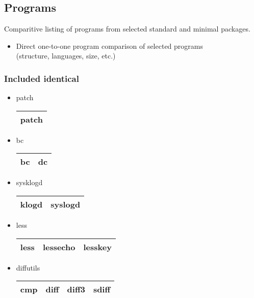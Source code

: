 \subsection{Programs}\label{Programs}

Comparitive listing of programs from selected standard and minimal packages.

\begin{itemize}
    \item Direct one-to-one program comparison of selected programs \\(structure, languages, size, etc.)
\end{itemize}

\newpage

\subsubsection{Included identical}

\begin{itemize}
    \item patch
        \begin{center}
            \begin{tabular}{|c|}
                \hline
                patch \\
                \hline
            \end{tabular}
        \end{center}
    \item bc
        \begin{center}
            \begin{tabular}{|c|c|}
                \hline
                bc & dc \\
                \hline
            \end{tabular}
        \end{center}
    \item sysklogd
        \begin{center}
            \begin{tabular}{|c|c|}
                \hline
                klogd & syslogd \\
                \hline
            \end{tabular}
        \end{center}

    \item less
        \begin{center}
            \begin{tabular}{|c|c|c|}
                \hline
                less & lessecho & lesskey \\
                \hline
            \end{tabular}
        \end{center}
    \item diffutils
        \begin{center}
            \begin{tabular}{|c|c|c|c|}
                \hline
                cmp & diff & diff3 & sdiff \\
                \hline
            \end{tabular}
        \end{center}
    \end{itemize}
